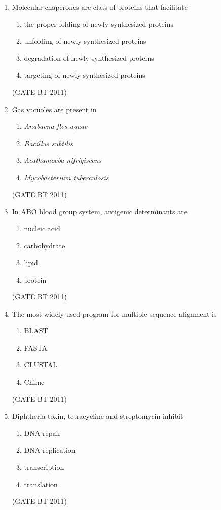 \documentclass[journal,12pt,onecolumn]{IEEEtran}
\begin{document}
\begin{enumerate}
\item Molecular chaperones are class of proteins that facilitate  
\begin{enumerate}
\item the proper folding of newly synthesized proteins  
\item unfolding of newly synthesized proteins  
\item degradation of newly synthesized proteins  
\item targeting of newly synthesized proteins  
\end{enumerate}
\hfill(GATE BT 2011)


\item Gas vacuoles are present in  
\begin{enumerate}
\item \textit{Anabaena flos-aquae}  
\item \textit{Bacillus subtilis}  
\item \textit{Acathamoeba nifrigiscens}  
\item \textit{Mycobacterium tuberculosis}  
\end{enumerate}
\hfill(GATE BT 2011)

\item In ABO blood group system, antigenic determinants are  
\begin{multicols}{2}
\begin{enumerate}
\item nucleic acid  
\item carbohydrate  
\item lipid  
\item protein  
\end{enumerate}
\end{multicols} \hfill(GATE BT 2011)

\item The most widely used program for multiple sequence alignment is  
\begin{multicols}{2}
\begin{enumerate}
\item BLAST  
\item FASTA  
\item CLUSTAL  
\item Chime  
\end{enumerate}
\end{multicols} \hfill(GATE BT 2011)

\item Diphtheria toxin, tetracycline and streptomycin inhibit  
\begin{multicols}{2}
\begin{enumerate}
\item DNA repair  
\item DNA replication  
\item transcription  
\item translation  
\end{enumerate}
\end{multicols} \hfill(GATE BT 2011)


\end{enumerate}
\end{document}
